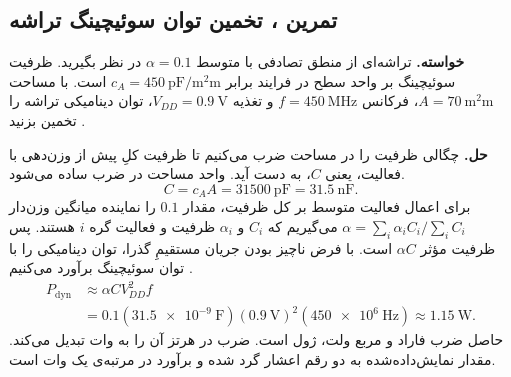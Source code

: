 \subsection{تمرین ، تخمین توان سوئیچینگ تراشه}
\label{sec:assignment-power-chip}

\textbf{خواسته.}
تراشه‌ای از منطق تصادفی با  متوسط \(\alpha=0.1\)
در نظر بگیرید. ظرفیت سوئیچینگ بر واحد سطح در فرایند 
برابر \(c_A=\qty[per-mode=symbol]{450}{\pico\farad\per\square\milli\metre}\)
است. با مساحت \(A=\qty{70}{\square\milli\metre}\)، فرکانس
\(f=\qty{450}{\mega\hertz}\) و تغذیه \(V_{DD}=\qty{0.9}{\volt}\)،
توان دینامیکی تراشه را تخمین بزنید \cite[تمرین ، صفحه ۲۰۹]{weste}.

\textbf{حل.}
چگالی ظرفیت را در مساحت ضرب می‌کنیم تا ظرفیت کلِ پیش از وزن‌دهی
با فعالیت، یعنی \(C\)، به دست آید. واحد مساحت در ضرب ساده می‌شود.
\[
  C=c_AA=\qty{31500}{\pico\farad}=\qty{31.5}{\nano\farad}.
\]
برای اعمال فعالیت متوسط بر کل ظرفیت، مقدار \(0.1\) را نماینده
میانگین وزن‌دار \(\alpha=\sum_i\alpha_i C_i/\sum_i C_i\) می‌گیریم
که \(C_i\) و \(\alpha_i\) ظرفیت و فعالیت گره \(i\) هستند.
پس ظرفیت مؤثر \(\alpha C\) است. با فرض ناچیز بودن جریان
مستقیمِ گذرا، توان دینامیکی را با توان سوئیچینگ برآورد می‌کنیم
\cite[رابطه ، صفحه ۱۸۴]{weste}.
\[
  \begin{aligned}
    P_{\mathrm{dyn}}&\approx \alpha C V_{DD}^{2} f\\
      &=0.1(\qty{31.5e-9}{\farad})(\qty{0.9}{\volt})^{2}
             (\qty{450e6}{\hertz})\approx\qty{1.15}{\watt}.
  \end{aligned}
\]
حاصل ضرب فاراد و مربع ولت، ژول است. ضرب در هرتز آن را به وات
تبدیل می‌کند. مقدار نمایش‌داده‌شده به دو رقم اعشار گرد شده و
برآورد در مرتبه‌ی یک وات است.
